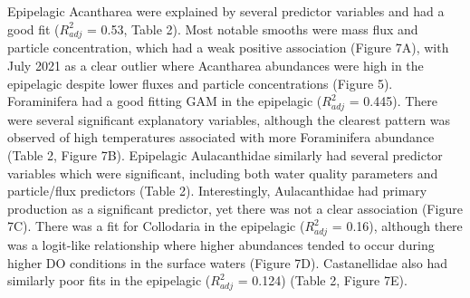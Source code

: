 \documentclass[
]{article}
\begin{document}
Epipelagic Acantharea were explained by several predictor variables and
had a good fit (\(R^2_{adj}\) = 0.53, Table 2). Most notable smooths
were mass flux and particle concentration, which had a weak positive
association (Figure 7A), with July 2021 as a clear outlier where
Acantharea abundances were high in the epipelagic despite lower fluxes
and particle concentrations (Figure 5). Foraminifera had a good fitting
GAM in the epipelagic (\(R^2_{adj}\) = 0.445). There were several
significant explanatory variables, although the clearest pattern was
observed of high temperatures associated with more Foraminifera
abundance (Table 2, Figure 7B). Epipelagic Aulacanthidae similarly had
several predictor variables which were significant, including both water
quality parameters and particle/flux predictors (Table 2).
Interestingly, Aulacanthidae had primary production as a significant
predictor, yet there was not a clear association (Figure 7C). There was
a fit for Collodaria in the epipelagic (\(R^2_{adj}\) = 0.16), although
there was a logit-like relationship where higher abundances tended to
occur during higher DO conditions in the surface waters (Figure 7D).
Castanellidae also had similarly poor fits in the epipelagic
(\(R^2_{adj}\) = 0.124) (Table 2, Figure 7E).
\end{document}
